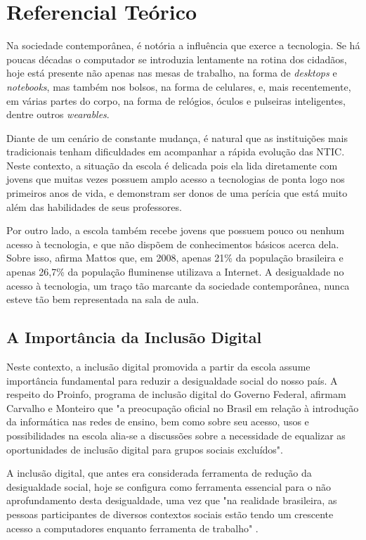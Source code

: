 \chapter{Referencial Teórico}\label{chp:LABEL_CHP_REF_TEO}

Na sociedade contemporânea, é notória a influência que exerce a tecnologia. Se há poucas décadas o computador se introduzia lentamente na rotina dos cidadãos, hoje está presente não apenas nas mesas de trabalho, na forma de \textit{desktops} e \textit{notebooks}, mas também nos bolsos, na forma de celulares, e, mais recentemente, em várias partes do corpo, na forma de relógios, óculos e pulseiras inteligentes, dentre outros \textit{wearables}.

Diante de um cenário de constante mudança, é natural que as instituições mais tradicionais tenham dificuldades em acompanhar a rápida evolução das NTIC. Neste contexto, a situação da escola é delicada pois ela lida diretamente com jovens que muitas vezes possuem amplo acesso a tecnologias de ponta logo nos primeiros anos de vida, e demonstram ser donos de uma perícia que está muito além das habilidades de seus professores.

Por outro lado, a escola também recebe jovens que possuem pouco ou nenhum acesso à tecnologia, e que não dispõem de conhecimentos básicos acerca dela. Sobre isso, afirma Mattos \cite{art:REF_ART_MATTOS} que, em 2008, apenas 21\% da população brasileira e apenas 26,7\% da população fluminense utilizava a Internet. A desigualdade no acesso à tecnologia, um traço tão marcante da sociedade contemporânea, nunca esteve tão bem representada na sala de aula.

\section{A Importância da Inclusão Digital}\label{sec:LABEL_CHP_REF_TEO_SEC_ID}

Neste contexto, a inclusão digital promovida a partir da escola assume importância fundamental para reduzir a desigualdade social do nosso país. A respeito do Proinfo, programa de inclusão digital do Governo Federal, afirmam Carvalho e Monteiro \cite{art:REF_ART_CARVALHO_MONTEIRO} que "a preocupação oficial no Brasil em relação à introdução da informática nas redes de ensino, bem como sobre seu acesso, usos e possibilidades na escola alia-se a discussões sobre a necessidade de equalizar as oportunidades de inclusão digital para grupos sociais excluídos".

A inclusão digital, que antes era considerada ferramenta de redução da desigualdade social, hoje se configura como ferramenta essencial para o não aprofundamento desta desigualdade, uma vez que "na realidade brasileira, as pessoas participantes de diversos contextos sociais estão tendo um crescente acesso a computadores enquanto ferramenta de trabalho" \cite{art:REF_ART_CARVALHO_MONTEIRO}.

